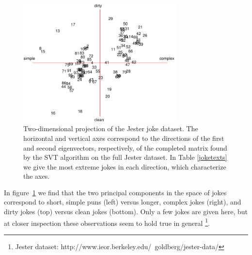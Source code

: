 \documentclass{article} %
\begin{document}
\begin{figure} [h]
\centering
\includegraphics[width = 0.75\textwidth]{jokes_2d_2.pdf}
\caption{Two-dimensional projection of the Jester joke dataset. The
  horizontal and vertical axes correspond to the directions of the
  first and second eigenvectors, respectively, of the completed matrix
  found by the SVT algorithm on the full Jester dataset. In Table
  \ref{joketexts} we give the most extreme jokes in each direction,
  which characterize the axes.}
\label{jokes2d}
\end{figure}

In figure~\ref{jokes2d} we find that the two principal components in
the space of jokes correspond to short, simple puns (left) versus
longer, complex jokes (right), and dirty jokes (top) versus clean
jokes (bottom). Only a few jokes are given here, but at closer
inspection these observations seem to hold true in general
\footnote{Jester dataset:
  http://www.ieor.berkeley.edu/~goldberg/jester-data/}.
\end{document}
